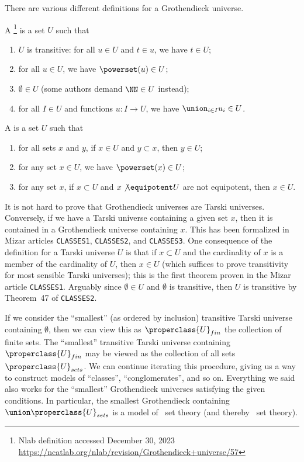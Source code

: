 \begin{node}\label{tg-0001}%
There are various different definitions for a Grothendieck universe.
\begin{definition}\label{set:tg-x0000}%
A \footnote{Nlab definition accessed
December 30, 2023 \url{https://ncatlab.org/nlab/revision/Grothendieck+universe/57}} is a set $U$ such that
\begin{enumerate}
\item $U$ is transitive: for all $u\in U$ and $t\in u$, we have $t\in U$;
\item for all $u\in U$, we have $\powerset(u)\in U$;
\item $\emptyset\in U$ (some authors demand $\NN\in U$ instead);
\item for all $I\in U$ and functions $u\colon I\to U$, we have
  $\union_{i\in I}u_{i}\in U$.
\end{enumerate}
\end{definition}
\begin{definition}
A  is a set $U$ such that
\begin{enumerate}
\item for all sets $x$ and $y$, if $x\in U$ and $y\subset x$, then $y\in U$;
\item for any set $x\in U$, we have $\powerset(x)\in U$;
\item for any set $x$, if $x\subset U$ and $x\not\equipotent U$ are not equipotent, then $x\in U$.
\end{enumerate}
\begin{node}[Remarks]\label{tg-0002}%
It is not hard to prove that Grothendieck universes are Tarski
universes.  Conversely, if we have a Tarski universe containing a given
set $x$, then it is contained in a Grothendieck universe containing
$x$. This has been formalized in Mizar articles \texttt{CLASSES1},
\texttt{CLASSES2}, and \texttt{CLASSES3}. One consequence of the
definition for a Tarski universe $U$ is that if $x\subset U$ and the
cardinality of $x$ is a member of the cardinality of $U$, then $x\in U$
(which suffices to prove transitivity for most sensible Tarski
universes); this is the first theorem proven in the Mizar article
\texttt{CLASSES1}. Arguably since $\emptyset\in U$ and $\emptyset$ is
transitive, then $U$ is transitive by Theorem~47 of \texttt{CLASSES2}.

If we consider the ``smallest'' (as ordered by inclusion) transitive
Tarski universe containing $\emptyset$, then we can view this as
$\properclass{U}_{fin}$ the collection of finite sets. The ``smallest''
transitive Tarski universe containing $\properclass{U}_{fin}$ may be
viewed as the collection of all sets $\properclass{U}_{sets}$. We can
continue iterating this procedure, giving us a way to construct
models of ``classes'', ``conglomerates'', and so on. Everything we said
also works for the ``smallest'' Grothendieck universes satisfying the
given conditions. In particular, the smallest Grothendieck containing $\union\properclass{U}_{sets}$
is a model of \MK\ set theory (and thereby \NBG\ set theory).


\end{node}
\end{definition}
\end{node}
